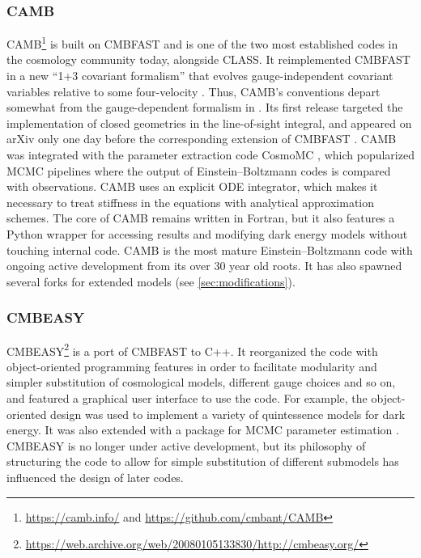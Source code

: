 \documentclass[USenglish, thumbmarks]{uiophdthesis} %
\newcommand\LCDM{\ensuremath{\mathrm{\Lambda CDM}}}
\newcommand\EB{Einstein--Boltzmann}
\begin{document}
\subsubsection{CAMB}
CAMB\footnote{\url{https://camb.info/} and \url{https://github.com/cmbant/CAMB}} \cite{lewisEfficientComputationCMB2000a,lewisCAMBV2Cosmological2026a}
is built on CMBFAST and is one of the two most established codes in the cosmology community today, alongside CLASS.
It reimplemented CMBFAST in a new \enquote{1+3 covariant formalism} that evolves gauge-independent covariant variables relative to some four-velocity \cite{challinorCosmicMicrowaveBackground1999}.
Thus, CAMB's conventions depart somewhat from the gauge-dependent formalism in \cite{maCosmologicalPerturbationTheory1995a}.
Its first release targeted the implementation of closed geometries in the line-of-sight integral,
and appeared on arXiv only one day before the corresponding extension of CMBFAST \cite{lewisEfficientComputationCMB2000a,zaldarriagaCMBFASTSpatiallyClosed2000}.
CAMB was integrated with the parameter extraction code CosmoMC \cite{lewisCosmologicalParametersCMB2002},
which popularized MCMC pipelines where the output of \EB{} codes is compared with observations.
CAMB uses an explicit ODE integrator,
which makes it necessary to treat stiffness in the equations with analytical approximation schemes.
The core of CAMB remains written in Fortran,
but it also features a Python wrapper for accessing results
and modifying dark energy models without touching internal code.
CAMB is the most mature \EB{} code with ongoing active development from its over 30 year old roots.
It has also spawned several forks for extended models (see \cref{sec:modifications}).

\subsubsection{CMBEASY}
CMBEASY\footnote{\url{https://web.archive.org/web/20080105133830/http://cmbeasy.org/}} \cite{doranCMBEASYObjectOriented2005a,doranSpeedingCosmologicalBoltzmann2005b}
is a port of CMBFAST to C++.
It reorganized the code with object-oriented programming features
in order to facilitate modularity and simpler substitution of cosmological models, different gauge choices and so on,
and featured a graphical user interface to use the code.
For example, the object-oriented design was used to implement a variety of quintessence models for dark energy.
It was also extended with a package for MCMC parameter estimation \cite{doranAnalyzeThisCosmological2004}.
CMBEASY is no longer under active development,
but its philosophy of structuring the code to allow for simple substitution of different submodels has influenced the design of later codes.
\end{document}
